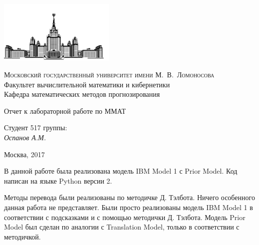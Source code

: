 \documentclass[12pt, a4paper]{article}
\begin{document}
    \thispagestyle{empty}

    \begin{singlespace}
    \begin{titlepage}
        \begin{center}
            \includegraphics[height = 3cm]{msu.png}

            {\scshape Московский государственный университет имени М.~В.~Ломоносова}\\
            Факультет вычислительной математики и кибернетики\\
            Кафедра математических методов прогнозирования\\
            \centerline{\hfill\hrulefill\hrulefill\hrulefill\hrulefill\hfill}

            \vfill

            {\LARGE Отчет к лабораторной работе  по ММАТ}

            \vspace{1cm}

        \end{center}

        \vfill

        \begin{flushright}
            Студент 517 группы:\\
                \textit{Оспанов А.М.}

            \vspace{5mm}

        \end{flushright}

        \vfill

        \begin{center}
            Москва, 2017
        \end{center}
    \end{titlepage}
    \end{singlespace}

    \newpage

    В данной работе была реализована модель IBM Model 1 с Prior Model. Код написан на языке Python версии 2.

    Методы перевода были реализованы по методичке Д. Тэлбота. Ничего особенного данная работа не представляет. Были просто реализованы модель IBM Model 1
    в соответствии с подсказками и с помощью методички Д. Тэлбота. Модель Prior Model был сделан по аналогии с Translation Model, только в соответствии с методичкой.
\end{document}
